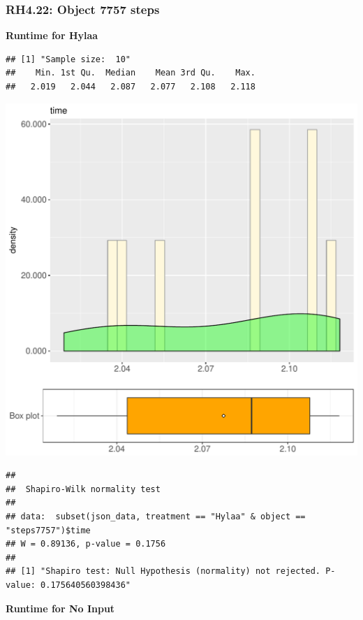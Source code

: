 \documentclass{article}\usepackage[]{graphicx}\usepackage[]{color}
\makeatletter
\def\maxwidth{ %
  \ifdim\Gin@nat@width>\linewidth
    \linewidth
  \else
    \Gin@nat@width
  \fi
}
\newenvironment{kframe}{%
 \def\at@end@of@kframe{}%
 \ifinner\ifhmode%
  \def\at@end@of@kframe{\end{minipage}}%
  \begin{minipage}{\columnwidth}%
 \fi\fi%
 \def\FrameCommand##1{\hskip\@totalleftmargin \hskip-\fboxsep
 \colorbox{shadecolor}{##1}\hskip-\fboxsep
     \hskip-\linewidth \hskip-\@totalleftmargin \hskip\columnwidth}%
 \MakeFramed {\advance\hsize-\width
   \@totalleftmargin\z@ \linewidth\hsize
   \@setminipage}}%
 {\par\unskip\endMakeFramed%
 \at@end@of@kframe}
\newenvironment{knitrout}{}{} %
\makeatother
\begin{document}
\subsubsection{RH4.22: Object 7757 steps}

 \textbf{Runtime for Hylaa}
\begin{knitrout}
\color{fgcolor}\begin{kframe}
\begin{verbatim}
## [1] "Sample size:  10"
##    Min. 1st Qu.  Median    Mean 3rd Qu.    Max. 
##   2.019   2.044   2.087   2.077   2.108   2.118
\end{verbatim}
\end{kframe}
\includegraphics[width=\maxwidth]{figure/RH4_Hylaa_steps7757-1} 
\begin{kframe}\begin{verbatim}
## 
## 	Shapiro-Wilk normality test
## 
## data:  subset(json_data, treatment == "Hylaa" & object == "steps7757")$time
## W = 0.89136, p-value = 0.1756
## 
## [1] "Shapiro test: Null Hypothesis (normality) not rejected. P-value: 0.175640560398436"
\end{verbatim}
\end{kframe}
\end{knitrout}
 \textbf{Runtime for No Input}
\end{document}
